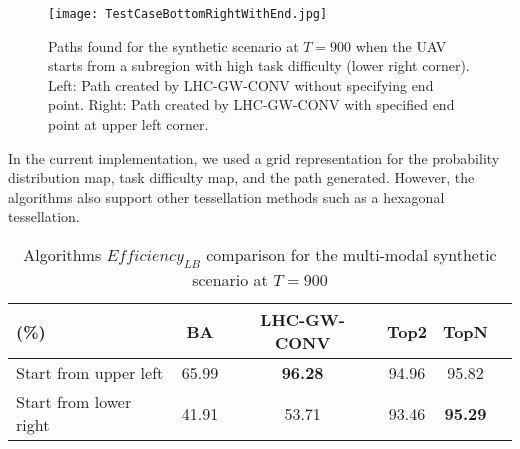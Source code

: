 \documentclass[journal]{IEEEtran}
\begin{document}
\begin{figure}
\centering
\texttt{[image: TestCaseBottomRightWithEnd.jpg]}
\caption{Paths found for the synthetic scenario at $T=900$ when the UAV starts from a subregion with high task difficulty (lower right corner). Left: Path created by LHC-GW-CONV without specifying end point. Right: Path created by LHC-GW-CONV with specified end point at upper left corner.}
\label{SyntheticCasePaths3}
\end{figure}


In the current implementation, we used a grid representation for the probability distribution map, task difficulty map, and the path generated. However, the algorithms also support other tessellation methods such as a hexagonal tessellation.
\begin{table}[!ht]
\caption{Algorithms $\mathit{Efficiency_{LB}}$ comparison for the multi-modal synthetic scenario at $T=900$}
	\centering
		\begin{tabular}
			{|l|c|c|c|c|c|}
			\hline
			(\%) & BA & LHC-GW-CONV & Top2 & TopN \\
			\hline
			Start from upper left & 65.99 & \textbf{96.28} & 94.96 & 95.82 \\
			\hline			
			Start from lower right & 41.91 & 53.71 & 93.46 & \textbf{95.29} \\			\hline			
		\end{tabular}
\label{Synthetic}
\end{table}
\end{document}
